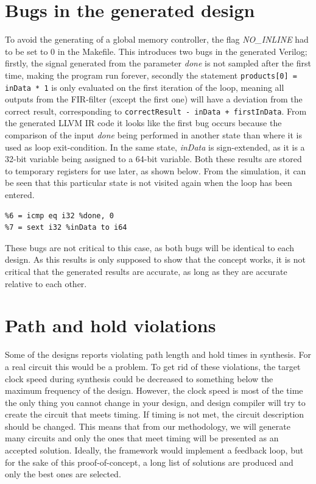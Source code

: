 \section{Bugs in the generated design}
To avoid the generating of a global memory controller, the flag \textit{NO\_INLINE} had to be set to 0 in the Makefile. This introduces two bugs in the generated Verilog; firstly, the signal generated from the parameter \textit{done} is not sampled after the first time, making the program run forever, secondly the statement \verb!products[0] = inData * 1! is only evaluated on the first iteration of the loop, meaning all outputs from the FIR-filter (except the first one) will have a deviation from the correct result, corresponding to \verb!correctResult - inData + firstInData!. From the generated LLVM IR code it looks like the first bug occurs because the comparison of the input \textit{done} being performed in another state than where it is used as loop exit-condition. In the same state, \textit{inData} is sign-extended, as it is a 32-bit variable being assigned to a 64-bit variable. Both these results are stored to temporary registers for use later, as shown below. From the simulation, it can be seen that this particular state is not visited again when the loop has been entered.
\lstset{language=llvm,style=LLVMstyle}
\begin{lstlisting}
%6 = icmp eq i32 %done, 0
%7 = sext i32 %inData to i64
\end{lstlisting}
These bugs are not critical to this case, as both bugs will be identical to each design. As this results is only supposed to show that the concept works, it is not critical that the generated results are accurate, as long as they are accurate relative to each other.
\section{Path and hold violations}
Some of the designs reports violating path length and hold times in synthesis. For a real circuit this would be a problem. To get rid of these violations, the target clock speed during synthesis could be decreased to something below the maximum frequency of the design. However, the clock speed is most of the time the only thing you cannot change in your design, and design compiler will try to create the circuit that meets timing. If timing is not met, the circuit description should be changed. This means that from our methodology, we will generate many circuits and only the ones that meet timing will be presented as an accepted solution. Ideally, the framework would implement a feedback loop, but for the sake of this proof-of-concept, a long list of solutions are produced and only the best ones are selected.

